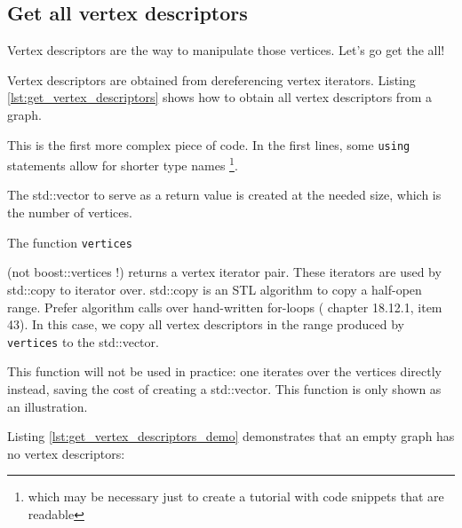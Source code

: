 

\subsection{Get all vertex descriptors}
\label{subsec:get_vertex_descriptors}

Vertex descriptors are the way to manipulate those vertices.
Let's go get the all!

Vertex descriptors are obtained from dereferencing vertex iterators.
Listing \ref{lst:get_vertex_descriptors}
shows how to obtain all vertex descriptors from a graph.



This is the first more complex piece of code.
In the first lines, some \verb;using; statements allow for shorter type names
\footnote{
  which may be necessary just to create a tutorial 
  with code snippets that are readable
}.

The std::vector to serve as a return value is created at the needed size,
which is the number of vertices.

The function \verb;vertices; 

(not boost::vertices !) 
returns a vertex iterator pair.
These iterators are used by std::copy to iterator over.
std::copy 
is an STL algorithm to copy a half-open range.
Prefer algorithm calls over hand-written for-loops (
\cite{stroustrup1997} chapter 18.12.1, 
\cite{meyers2005effective} item 43).
In this case, we copy all vertex descriptors in the range produced 
by \verb;vertices; to the std::vector.

This function will not be used in practice: one iterates over the vertices
directly instead, saving the cost of creating a std::vector.
This function is only shown as an illustration.

Listing \ref{lst:get_vertex_descriptors_demo}
demonstrates that an empty graph has no vertex descriptors:



